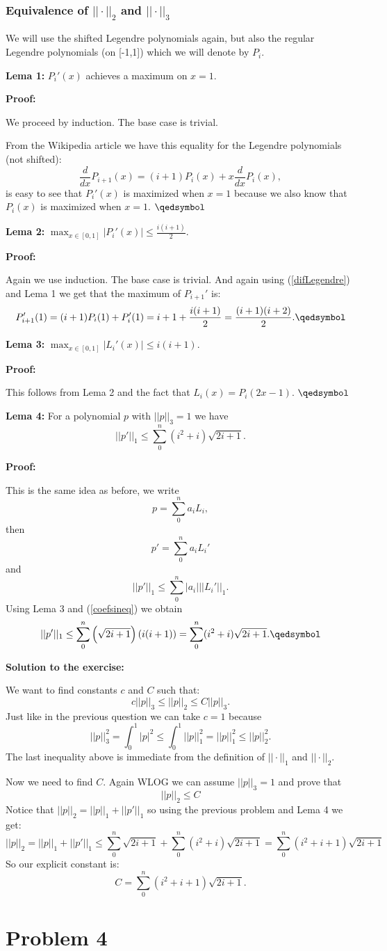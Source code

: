 \documentclass{article}
\begin{document}
\subsubsection*{Equivalence of $||\cdot||_2$ and $||\cdot||_3$}
We will use the shifted Legendre polynomials again, but also the regular
Legendre polynomials (on [-1,1]) which we will denote by $P_i$.

\textbf{Lema 1:} $P_i'(x)$ achieves a maximum on $x=1$.

\textbf{Proof:}

We proceed by induction. The base case is trivial.

From the Wikipedia article we have this equality for the Legendre polynomials
(not shifted):
\begin{equation}\label{difLegendre}
	\frac{d}{dx}P_{i+1}(x)= (i+1)P_i(x)+x\frac{d}{dx}P_i(x),
\end{equation}
is easy to see that $P_i'(x)$ is maximized when $x=1$ because we also know that
$P_i(x)$ is maximized when $x=1$. $\qedsymbol$

\textbf{Lema 2:} $\max_{x\in[0,1]}|P_i'(x)|\leq \frac{i(i+1)}{2}$.

\textbf{Proof:}

Again we use induction. The base case is trivial. And again using
(\ref{difLegendre}) and Lema 1 we get that the maximum of $P_{i+1}'$ is:
\[
	P_{i+1}'(1)=(i+1)P_i(1)+P_i'(1)=i+1+\frac{i(i+1)}{2}=\frac{(i+1)(i+2)}{2}.\qedsymbol
\]

\textbf{Lema 3:} $\max_{x\in[0,1]}|L_i'(x)|\leq i(i+1)$.

\textbf{Proof:}

This follows from Lema 2 and the fact that $L_i(x)=P_i(2x-1)$. $\qedsymbol$

\textbf{Lema 4:} For a polynomial $p$ with $||p||_3=1$ we have
\[
||p'||_1\leq \sum_0^n (i^2+i)\sqrt{2i+1}.
\]

\textbf{Proof:}

This is the same idea as before, we write
\[
	p=\sum_0^na_iL_i,
\]
then
\[
	p'=\sum_0^na_iL_i'
\]
and
\[
	||p'||_1 \leq \sum_0^n|a_i|||L_i'||_1.
\]
Using Lema 3 and (\ref{coefsineq}) we obtain
\[
	||p'||_1 \leq \sum_0^n\left(\sqrt{2i+1}\right)\left(i(i+1)\right)=\sum_0^n (i^2+i)\sqrt{2i+1}. \qedsymbol
\]

\textbf{Solution to the exercise:}

We want to find constants $c$ and $C$ such that:
\[
	c||p||_3\leq ||p||_2 \leq C||p||_3.
\]
Just like in the previous question we can take $c=1$ because
\[
||p||_3^2=\int_0^1|p|^2\leq \int_0^1||p||_1^2=||p||_1^2\leq ||p||_2^2.
\]
The last inequality above is immediate from the definition of $||\cdot||_1$ and $||\cdot||_2$.

Now we need to find $C$. Again WLOG we can assume $||p||_3=1$ and prove that
\[
	||p||_2\leq C
\]
Notice that $||p||_2=||p||_1+ ||p'||_1$ so using the previous problem and Lema 4 we get:
\[
	||p||_2=||p||_1+||p'||_1 \leq \sum_0^n \sqrt{2i+1} + \sum_0^n (i^2+i)\sqrt{2i+1} = \sum_0^n (i^2+i+1)\sqrt{2i+1}
\]
So our explicit constant is:
\[
	C=\sum_0^n (i^2+i+1)\sqrt{2i+1}.
\]
\section*{Problem 4}
\end{document}
